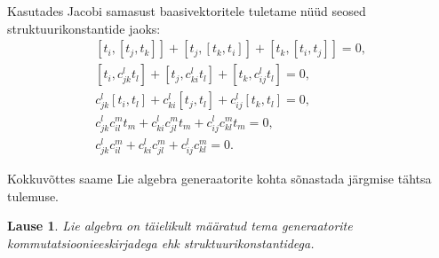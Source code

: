 \documentclass[a4paper,12pt]{article}
\theoremstyle{plain}
\newtheorem{lause}{Lause}[section]
\theoremstyle{definition}
\numberwithin{equation}{section}
\begin{document}
Kasutades Jacobi samasust baasivektoritele tuletame nüüd seosed struktuurikonstantide jaoks: 
\begin{align*}
\left[t_i, \left[t_j, t_k\right]\right] + \left[t_j, \left[t_k, t_i\right]\right] + \left[t_k, \left[t_i, t_j\right]\right] = 0, \\
\left[t_i, c_{jk}^{l}t_l\right] + \left[t_j, c_{ki}^{l}t_l\right] + \left[t_k, c_{ij}^{l}t_l\right] = 0, \\
c_{jk}^{l} \left[t_i, t_l\right] + c_{ki}^{l} \left[t_j, t_l\right] + c_{ij}^{l} \left[t_k, t_l\right] = 0, \\
c_{jk}^{l} c_{il}^{m} t_m + c_{ki}^{l} c_{jl}^{m} t_m + c_{ij}^{l} c_{kl}^{m} t_m = 0, \\
c_{jk}^{l} c_{il}^{m} + c_{ki}^{l} c_{jl}^{m} + c_{ij}^{l} c_{kl}^{m} = 0.
\end{align*}

Kokkuvõttes saame Lie algebra generaatorite kohta sõnastada järgmise tähtsa tulemuse.
\begin{lause}
Lie algebra on täielikult määratud tema generaatorite kommutatsiooni\-eeskirjadega ehk struktuurikonstantidega.
\end{lause}
\end{document}
